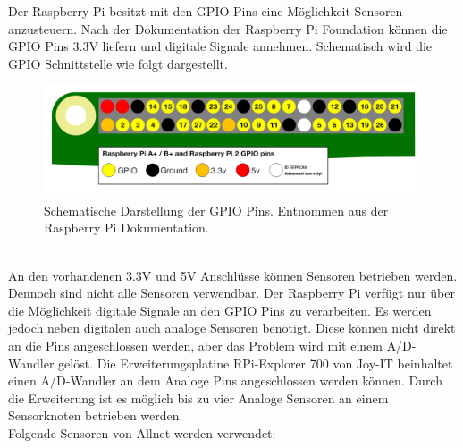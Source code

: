 Der Raspberry Pi besitzt mit den \ac{GPIO} Pins eine Möglichkeit Sensoren anzusteuern. Nach der Dokumentation der Raspberry Pi Foundation\cite{GPIOMode77:online} können die \ac{GPIO} Pins 3.3V liefern und digitale Signale annehmen. Schematisch wird die \ac{GPIO} Schnittstelle wie folgt dargestellt.
\begin{figure}[h]
	\includegraphics[width=\textwidth]{Bilder/Kapitel2/gpio_pins_pi2.png}
	\caption[Schema GPIO Pins]{Schematische Darstellung der GPIO Pins. Entnommen aus der Raspberry Pi Dokumentation\cite{GPIOMode77:online}.}
	\label{fig:Kapitel2/gpio_pins_pi2.png}
\end{figure}\\
An den vorhandenen 3.3V und 5V Anschlüsse können Sensoren betrieben werden. Dennoch sind nicht alle Sensoren verwendbar. Der Raspberry Pi verfügt nur über die Möglichkeit digitale Signale an den \ac{GPIO} Pins zu verarbeiten. Es werden jedoch neben digitalen auch analoge Sensoren benötigt. Diese können nicht direkt an die Pins angeschlossen werden, aber das Problem wird mit einem \ac{A/D-Wandler} gelöst. Die Erweiterungsplatine RPi-Explorer 700 von Joy-IT \cite{joyitrpi87:online} beinhaltet einen \ac{A/D-Wandler} an dem Analoge Pins angeschlossen werden können. Durch die Erweiterung ist es möglich bis zu vier Analoge Sensoren an einem Sensorknoten betrieben werden.\\
Folgende Sensoren von Allnet\cite{111861pd90:online} werden verwendet:
